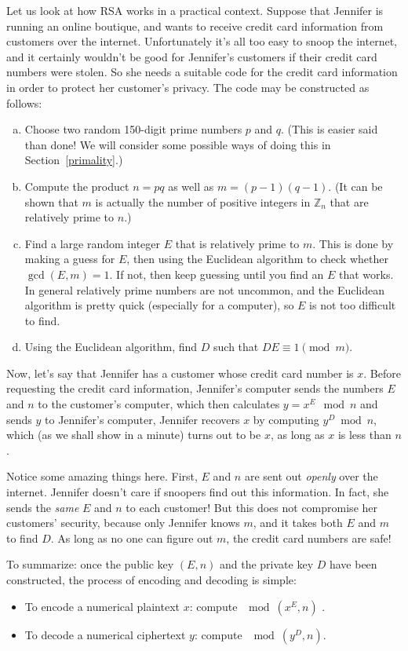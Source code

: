 Let us look at how RSA works in a practical context.  
Suppose that Jennifer is running an online boutique, and wants to receive
 credit card information from customers over the internet. Unfortunately it's all too easy to snoop the internet, 
and it certainly wouldn't be good for Jennifer's customers if their credit card numbers were stolen. 
So she needs a suitable code for the credit card information in order to protect her customer's privacy.
The code may be constructed as follows:
\begin{enumerate}[(a)]
\item 
Choose  two random 150-digit prime
numbers $p$ and $q$. (This is easier said than done!  We will consider some possible ways of doing this in Section~\ref{primality}.)
\item
Compute the product $n= pq$ as well as $ m = (p - 1)(q-1)$. 
(It can be shown that $m$ is actually the number of positive integers in $\mathbb{Z}_n$ that are relatively prime to $n$.)    
\item
Find a large random integer $E$ that is relatively prime to $m$. This is done by making a guess for $E$, then using the Euclidean algorithm to check whether $\gcd(E, m) = 1$. If not, then keep guessing until you find an $E$ that works. In general relatively prime numbers are not uncommon, and the Euclidean algorithm is pretty quick (especially for a computer), so $E$ is not too difficult to find.  
\item
Using the Euclidean algorithm, find $D$ such that \mbox{$DE \equiv 1 \pmod{m}$}. 
\end{enumerate}
 Now, let's say that Jennifer has a  customer whose credit card number is $x$.  Before requesting the credit card information, Jennifer's computer  sends the numbers  $E$ and $n$ to the customer's computer, which then calculates $y = x^E \mod n$ and sends $y$ to
Jennifer's computer, Jennifer recovers $x$ by computing  $y^D \bmod
n$, which (as we shall show in a minute) turns out to be $x$, as long as $x$ is less than $n$. 

Notice some amazing things here. First, $E$ and $n$ are sent out \emph{openly} over the internet. Jennifer doesn't care if  snoopers find out this information. In fact, she sends the \emph{same} $E$ and $n$ to each customer! But this does not compromise her customers' security, because only Jennifer knows $m$, and it takes both $E$ and $m$ to find $D$. As long as no one can figure out $m$, the credit card numbers are safe!

To summarize: once the public key $(E,n)$ and the private key $D$ have been constructed, the process of encoding and decoding is simple:
\begin{itemize}
\item
To encode a numerical plaintext $x$:  compute $\mod (x^E,n)$ .
\item
To decode a numerical ciphertext $y$: compute $\mod(y^D,n)$.
\end{itemize}
 
